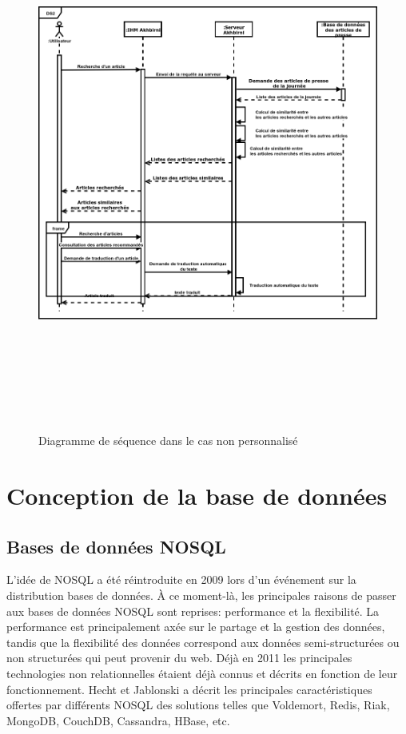 \begin{figure}[H]
	\centering
	\includegraphics[height=500pt,width=425pt]{img/chapter3/diagseqnonperso.png}
	\caption{Diagramme de séquence dans le cas non personnalisé}
\end{figure}

\section{Conception de la base de données}
\subsection{Bases de données NOSQL}
L'idée de NOSQL a été réintroduite en 2009 lors d'un événement sur la distribution bases de données. À ce moment-là, les principales raisons de passer aux bases de données NOSQL sont reprises: performance et la flexibilité. La performance est principalement axée sur le partage et la gestion des données, tandis que la flexibilité des données correspond aux données semi-structurées ou non structurées qui peut provenir du web. Déjà en 2011 les principales technologies non relationnelles étaient déjà connus et décrits en fonction de leur fonctionnement. Hecht et
Jablonski \cite{NOSQL1} a décrit les principales caractéristiques offertes par différents NOSQL des solutions telles que Voldemort, Redis, Riak, MongoDB, CouchDB, Cassandra, HBase, etc.

